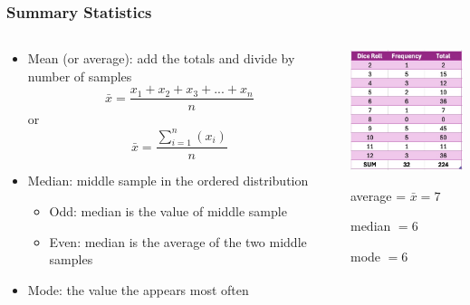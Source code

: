 \documentclass{beamer}
\begin{document}
\begin{frame}\frametitle{Summary Statistics}


\begin{columns}
\begin{column}{7cm}
\begin{itemize}
\item Mean (or average): add the totals and divide by number of samples
\[ \bar{x} = \frac{x_1 + x_2 + x_3 + ... + x_n}{n} \]
or
\[ \bar{x} = \frac{\sum_{i=1}^{n} (x_i)}{n}\]
\item Median: middle sample in the ordered distribution
\begin{itemize}
\item Odd: median is the value of middle sample
\item Even: median is the average of the two middle samples
\end{itemize}
\item Mode: the value the appears most often
\end{itemize}
\end{column}
\begin{column}{4cm}
\begin{center}
\includegraphics[width=4cm]{fig/stat2.jpg}


average = $\bar{x} = 7$

median $= 6$

mode $ = 6$
\end{center}
\end{column}
\end{columns}
\end{frame}
\end{document}
